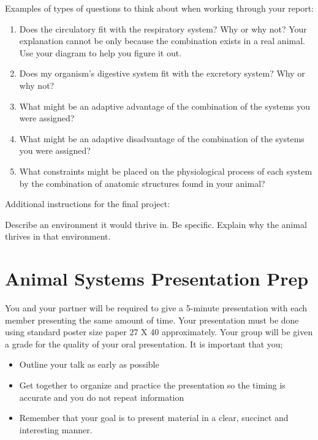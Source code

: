 \documentclass[
]{book}
\providecommand{\tightlist}{%
  \setlength{\itemsep}{0pt}\setlength{\parskip}{0pt}}
\begin{document}
Examples of types of questions to think about when working through your report:

\begin{enumerate}
\def\labelenumi{\arabic{enumi}.}
\tightlist
\item
  Does the circulatory fit with the respiratory system? Why or why not? Your explanation cannot be only because the combination exists in a real animal. Use your diagram to help you figure it out.
\item
  Does my organism's digestive system fit with the excretory system? Why or why not?
\item
  What might be an adaptive advantage of the combination of the systems you were assigned?
\item
  What might be an adaptive disadvantage of the combination of the systems you were assigned?
\item
  What constraints might be placed on the physiological process of each system by the combination of anatomic structures found in your animal?
\end{enumerate}

Additional instructions for the final project:

Describe an environment it would thrive in. Be specific. Explain why the animal thrives in that environment.

\hypertarget{animal-systems-presentation-prep}{%
\chapter*{Animal Systems Presentation Prep}\label{animal-systems-presentation-prep}}

You and your partner will be required to give a 5-minute presentation with each member presenting the same amount of time. Your presentation must be done using standard poster size paper 27 X 40 approximately. Your group will be given a grade for the quality of your oral presentation. It is important that you;

\begin{itemize}
\tightlist
\item
  Outline your talk as early as possible
\item
  Get together to organize and practice the presentation so the timing is accurate and you do not repeat information
\item
  Remember that your goal is to present material in a clear, succinct and interesting manner.
\end{itemize}
\end{document}
